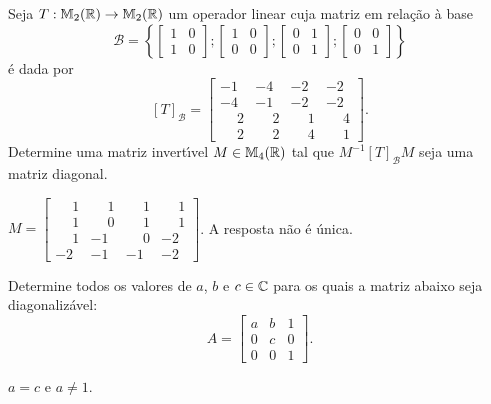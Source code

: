 \documentclass[12pt]{exam}
\begin{document}
\begin{exercicio}
  Seja $T : \mathbb{M}_2(\mathbb{R}) \to \mathbb{M}_2(\mathbb{R})$ um operador linear cuja matriz em rela\c{c}\~ao \`a base
  \[
    \mathcal{B} = \left\{\begin{bmatrix}1 & 0\\ 1 & 0\end{bmatrix}; \begin{bmatrix}1 & 0\\ 0 & 0\end{bmatrix}; \begin{bmatrix}0 & 1\\ 0 & 1\end{bmatrix}; \begin{bmatrix}0 & 0\\ 0 & 1\end{bmatrix}\right\}
  \]
  \'e dada por
  \[
    [T]_\mathcal{B} = \begin{bmatrix}
      -1 & -4 & -2 & -2\\
      -4 & -1 & -2 & -2\\
      \phantom{-} 2 & \phantom{-} 2 & \phantom{-} 1 & \phantom{-} 4\\
      \phantom{-} 2 & \phantom{-} 2 & \phantom{-} 4 & \phantom{-} 1
    \end{bmatrix}.
  \]
  Determine uma matriz invert{\'\i}vel $M \in \mathbb{M}_4(\mathbb{R})$ tal que $M^{-1}[T]_\mathcal{B}M$ seja uma matriz diagonal.
\begin{solucao}
  $M = \begin{bmatrix}
    \phantom{-} 1 & \phantom{-} 1 & \phantom{-} 1 & \phantom{-} 1\\
    \phantom{-} 1 & \phantom{-} 0 & \phantom{-} 1 & \phantom{-} 1\\
    \phantom{-} 1 & -1 & \phantom{-} 0 & -2\\
    -2 & -1 & -1 & -2
  \end{bmatrix}$. A resposta n\~ao \'e \'unica.
\end{solucao}
\end{exercicio}

\begin{exercicio}
  Determine todos os valores de $a$, $b$ e $c \in \mathbb{C}$ para os quais a matriz abaixo seja diagonaliz\'avel:
  \[
    A = \begin{bmatrix}
      a & b & 1\\
      0 & c & 0\\
      0 & 0 & 1
    \end{bmatrix}.
  \]
  \begin{solucao}
    $a = c$ e $a \ne 1$.
  \end{solucao}
\end{exercicio}
\end{document}
